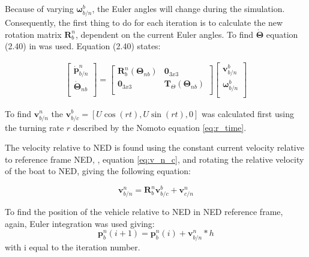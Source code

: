 Because of varying $\boldsymbol{\omega}^b_{b/n}$, the Euler angles will change during the simulation. Consequently, the first thing to do for each iteration is to calculate the new rotation matrix $\mathbf{R}^n_b$, dependent on the current Euler angles. To find $ \dot{\boldsymbol{\Theta}}$ equation (2.40) in \cite{Fossen2011} was used. Equation (2.40) states:

\begin{equation}
    \begin{aligned}
    \begin{bmatrix}
    \dot{\mathbf{p}}^n_{b/n} \\
    \dot{\boldsymbol{\Theta}}_{nb} \\
    \end{bmatrix}
    =
    \begin{bmatrix}
    \mathbf{R}^n_{b}(\boldsymbol{\Theta}_{nb}) & \mathbf{0}_{3x3} \\
    \mathbf{0}_{3x3} & \mathbf{T}_\Theta (\boldsymbol{\Theta}_{nb})  \\
    \end{bmatrix}
    \begin{bmatrix}
    \mathbf{v}^b_{b/n} \\
    \mathbf{\omega}^b_{b/n} \\
    \end{bmatrix}
    \end{aligned}
    \label{eq:eta_dot_J_eta}
\end{equation}

To find $\mathbf{v}^n_{b/n}$ the $\mathbf{v}^b_{b/c} = [U \cos(rt), U \sin(r t),0]$ was calculated first using the turning rate $r$ described by the Nomoto equation \eqref{eq:r_time}. 

The velocity relative to NED is found using the constant current velocity relative to reference frame NED, , equation \eqref{eq:v_n_c}, and rotating the relative velocity of the boat to NED, giving the following equation:

\begin{equation}
    \mathbf{v}^n_{b/n} = \mathbf{R}^n_{b} \mathbf{v}^b_{b/c} + \mathbf{v}^n_{c/n}
\end{equation}

To find the position of the vehicle relative to NED in NED reference frame, again, Euler integration was used giving:
\begin{equation}
    \mathbf{p}^n_b(i+1) = \mathbf{p}^n_b(i) + \mathbf{v}^n_{b/n} * h
\end{equation}
with i equal to the iteration number.

